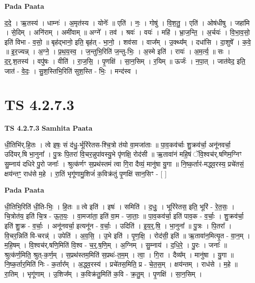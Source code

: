 \documentclass[17pt]{extarticle}
\begin{document}
\textbf{Pada Paata} \newline

द॒दे॒ । ऋ॒तस्य॑ । धाम्नः॑ । अ॒मृत॑स्य । योनेः᳚ ॥ एति॑ । नः॒ । गोषु॑ । वि॒श॒तु॒ । एति॑ । ओष॑धीषु । जहा॑मि । से॒दिम् । अनि॑राम् । अमी॑वाम् ॥ अग्ने᳚ । तव॑ । श्रवः॑ । वयः॑ । महि॑ । भ्रा॒ज॒न्ति॒ । अ॒र्चयः॑ । वि॒भा॒व॒सो॒ इति॑ विभा - व॒सो॒ ॥ बृह॑द्भानो॒ इति॒ बृह॑त् - भा॒नो॒ । शव॑सा । वाज᳚म् । उ॒क्थ्य᳚म् । दधा॑सि । दा॒शुषे᳚ । क॒वे॒ ॥ इ॒र॒ज्यन्न् । अ॒ग्ने॒ । प्र॒थ॒य॒स्व॒ । ज॒न्तुभि॒रिति॑ ज॒न्तु-भिः॒ । अ॒स्मे इति॑ । रायः॑ । अ॒म॒र्त्य॒ ॥ सः । द॒र्॒.श॒तस्य॑ । वपु॑षः । वीति॑ । रा॒ज॒सि॒ । पृ॒णक्षि॑ । सा॒न॒सिम् । र॒यिम् ॥ ऊर्जः॑ । न॒पा॒त् । जात॑वेद॒ इति॒ जात॑ - वे॒दः॒ । सु॒श॒स्तिभि॒रिति॑ सुश॒स्ति - भिः॒ । मन्द॑स्व ।  \newline




\section*{ TS 4.2.7.3 }

\textbf{TS 4.2.7.3 } \newline
\textbf{Samhita Paata} \newline

धी॒तिभि॑र्.हि॒तः । त्वे इषः॒ सं द॑धु॒-र्भूरि॑रेतस-श्चि॒त्रो त॑यो वा॒मजा॑ताः ॥ पा॒व॒कव॑र्चाः शु॒क्रव॑र्चा॒ अनू॑नवर्चा॒ उदि॑यर्.षि भा॒नुना᳚ । पु॒त्रः पि॒तरा॑ वि॒चर॒न्नुपा॑वस्यु॒भे पृ॑णक्षि॒ रोद॑सी ॥ ऋ॒तावा॑नं महि॒षं ॅवि॒श्वच॑र्.षणिम॒ग्निꣳ सु॒म्नाय॑ दधिरे पु॒रो जनाः᳚ । श्रुत्क॑र्णꣳ स॒प्रथ॑स्तमं त्वा गि॒रा दैव्यं॒ मानु॑षा यु॒गा ॥ नि॒ष्क॒र्तार॑-मद्ध्व॒रस्य॒ प्रचे॑तसं॒ क्षय॑न्तꣳ॒॒ राध॑से म॒हे । रा॒तिं भृगू॑णामु॒शिजं॑ क॒विक्र॑तुं पृ॒णक्षि॑ सान॒सिꣳ - [  ] \newline

\textbf{Pada Paata} \newline

धी॒तिभि॒रिति॑ धी॒ति-भिः॒ । हि॒तः ॥ त्वे इति॑ । इषः॑ । समिति॑ । द॒धुः॒ । भूरि॑रेतस॒ इति॒ भूरि॑ - रे॒त॒सः॒ । चि॒त्रोत॑य॒ इति॑ चि॒त्र - ऊ॒त॒यः॒ । वा॒मजा॑ता॒ इति॑ वा॒म - जा॒ताः॒ ॥ पा॒व॒कव॑र्चा॒ इति॑ पाव॒क - व॒र्चाः॒ । शु॒क्रव॑र्चा॒ इति॑ शु॒क्र - व॒र्चाः॒ । अनू॑नवर्चा॒ इत्यनू॑न - व॒र्चाः॒ । उदिति॑ । इ॒य॒र्॒.षि॒ । भा॒नुना᳚ ॥ पु॒त्रः । पि॒तरा᳚ । वि॒चर॒न्निति॑ वि-चरन्न्॑ । उपेति॑ । अ॒व॒सि॒ । उ॒भे इति॑ । पृ॒ण॒क्षि॒ । रोद॑सी॒ इति॑ ॥ ऋ॒तावा॑न॒मित्यृ॒त - वा॒न॒म् । म॒हि॒षम् । वि॒श्वच॑र्.षणि॒मिति॑ वि॒श्व - च॒र्॒.ष॒णि॒म् । अ॒ग्निम् । सु॒म्नाय॑ । द॒धि॒रे॒ । पु॒रः । जनाः᳚ ॥ श्रुत्क॑र्ण॒मिति॒ श्रुत्-क॒र्ण॒म् । स॒प्रथ॑स्तम॒मिति॑ स॒प्रथः॑-त॒म॒म् । त्वा॒ । गि॒रा । दैव्य᳚म् । मानु॑षा । यु॒गा ॥ नि॒ष्क॒र्तार॒मिति॑ निः - क॒र्तार᳚म् । अ॒द्ध्व॒रस्य॑ । प्रचे॑तस॒मिति॒ प्र - चे॒त॒स॒म् । क्षय॑न्तम् । राध॑से । म॒हे ॥ रा॒तिम् । भृगू॑णाम् । उ॒शिज᳚म् । क॒विक्र॑तु॒मिति॑ क॒वि - क्र॒तु॒म् । पृ॒णक्षि॑ । सा॒न॒सिम् ।  \newline
\end{document}
